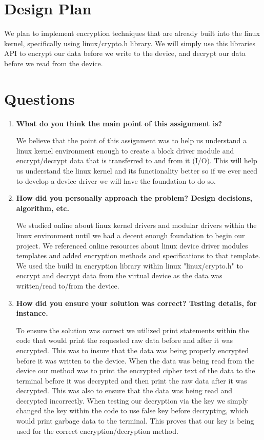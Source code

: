 \documentclass[onecolumn, draftclsnofoot,10pt, compsoc]{IEEEtran}
\begin{document}


\section{Design Plan}

		We plan to implement encryption techniques that are already built into the linux kernel,
		specifically using linux/crypto.h library. We will simply use this libraries API
		to encrypt our data before we write to the device, and decrypt our data before we read from the
		device. 
	
\section{Questions}
	\begin{enumerate}
		\item \textbf{What do you think the main point of this assignment is?}
	
		We believe that the point of this assignment was to help us understand a linux kernel
		environment enough to create a block driver module and encrypt/decrypt data that is 
		transferred to and from it (I/O). This will help us understand the linux kernel and its
		functionality better so if we ever need to develop a device driver we will have the foundation
		to do so. 
		
		\item \textbf{How did you personally approach the problem? Design decisions, algorithm, etc.}
	
		We studied online about linux kernel drivers and modular drivers within the linux environment
		until we had a decent enough foundation to begin our project. We referenced online resources
		about linux device driver modules templates and added encryption methods and specifications
		to that template. We used the build in encryption library within linux "linux/crypto.h" to 
		encrypt and decrypt data from the virtual device as the data was written/read to/from the device.
		
		\item \textbf{How did you ensure your solution was correct? Testing details, for instance.}
			
		To ensure the solution was correct we utilized print statements within the code that
		would print the requested raw data before and after it was encrypted.
		This was to insure that the data was being properly encrypted before it was written to the device. 
		When the data was being read from the device our method was to print the encrypted cipher text of the 
		data to the terminal before it was decrypted and then print the raw data after it was decrypted.
		This was also to ensure that the data was being read and decrypted incorrectly. When testing our decryption
		via the key we simply changed the key within the code to use false key before decrypting, which would print garbage 
		data to the terminal. This proves that our key is being used for the correct encryption/decryption method.
		

\end{enumerate}
\end{document}
